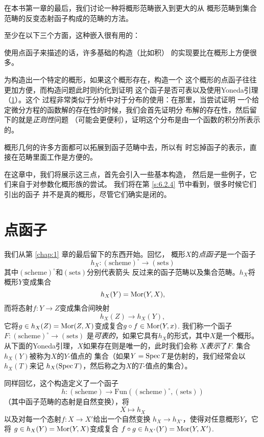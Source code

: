 在本书第一章的最后，我们讨论一种将概形范畴嵌入到更大的从
概形范畴到集合范畴的反变态射函子构成的范畴的方法。

至少在以下三个方面，这种嵌入很有用的：

\begin{compactenum}[(1)]
\item 使用点函子来描述的话，许多基础的构造（比如积）
的实现要比在概形上方便很多。
\item 为构造出一个特定的概形，如果这个概形存在，构造一个
这个概形的点函子往往更加方便，而构造问题此时则约化到证明
这个函子是否可表以及使用Yoneda引理（\ref{s:6.1}）。这个
过程非常类似于分析中对于分布的使用：在那里，当尝试证明
一个给定微分方程的函数解的存在性的时候，我们会首先证明分
布解的存在性，然后留下的就是\textit{正则性}问题
（可能会更便利），证明这个分布是由一个函数的积分所表示的。
\item 概形几何的许多方面都可以拓展到函子范畴中去，所以有
时忘掉函子的表示，直接在范畴里面工作是方便的。
\end{compactenum}

在这章中，我们将展示这三点，首先会引入一些基本构造，
然后是一些例子，它们来自于对参数化概形族的尝试。
我们将在第 \ref{s:6.2.4} 节中看到，很多时候它们引出的函子
并不是真的概形，尽管它们确实是闭的。


\section{点函子}\label{s:6.1}

我们从第 \ref{chap:1} 章的最后留下的东西开始。回忆，
概形$X$的\textit{点函子}是一个函子
\[
	h_X:(\text{scheme})^\circ \to (\text{sets})
\]
其中$(\text{scheme})^\circ$和$(\text{sets})$分别代表箭头
反过来的函子范畴以及集合范畴。$h_X$将概形$Y$变成集合
\[
	h_X(Y)=\operatorname{Mor}(Y,X),
\]
而将态射$f:Y\to Z$变成集合间映射
\[
	h_X(Z)\to h_X(Y),
\]
它将$g\in h_X(Z)=\operatorname{Mor}(Z,X)$变成复合$g\circ f\in \operatorname{Mor}(Y,x)$.
我们称一个函子$F:(\text{scheme})^\circ \to (\text{sets})$
是\textit{可表的}，如果它具有$h_X$的形式，其中$X$是一个概形。
从下面的Yoneda引理，$X$如果存在则是唯一的，此时我们会称
$X$\textit{表示}了$F$. 集合$h_X(Y)$被称为$X$的$Y$-值点的
集合（如果$Y=\operatorname{Spec} T$是仿射的，我们经常会以$h_X(T)$来记
$h_X(\operatorname{Spec} T)$，然后称之为$X$的$T$-值点的集合）。

同样回忆，这个构造定义了一个函子
\[
	h:(\text{scheme})\to \mathrm{Fun}
	((\text{scheme})^\circ ,(\text{sets}))
\]
（其中函子范畴的态射是自然变换），将
\[
	X\mapsto h_X
\]
以及对每一个态射$f:X\to X'$给出一个自然变换
$h_X\to h_{X'}$，使得对任意概形$Y$，它将
$g\in h_X(Y)=\operatorname{Mor}(Y,X)$变成复合
$f\circ g\in h_{X'}(Y)=\operatorname{Mor}(Y,X')$.

